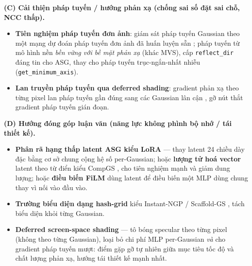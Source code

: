     \textbf{(C) Cải thiện pháp tuyến / hướng phản xạ (chống sai số đặt sai chỗ, NCC thấp).}
    \begin{itemize}
        \item \textbf{Tiên nghiệm pháp tuyến đơn ảnh}: giám sát pháp tuyến Gaussian
        theo một mạng dự đoán pháp tuyến đơn ảnh đã huấn luyện sẵn \cite{dnsplatter};
        pháp tuyến từ mô hình nền \textit{bền vững với bề mặt phản xạ} (khác MVS), cấp
        \texttt{reflect\_dir} đáng tin cho ASG, thay cho pháp tuyến trục-ngắn-nhất
        nhiễu (\texttt{get\_minimum\_axis}).
        \item \textbf{Lan truyền pháp tuyến qua deferred shading}: gradient phản xạ
        theo từng pixel lan pháp tuyến gần đúng sang các Gaussian lân cận
        \cite{deferredrefl}, gỡ nút thắt gradient pháp tuyến gián đoạn.
    \end{itemize}

    \textbf{(D) Hướng đóng góp luận văn (năng lực không phình bộ nhớ / tái thiết kế).}
    \begin{itemize}
        \item \textbf{Phân rã hạng thấp latent ASG kiểu LoRA} \cite{lora} --- thay
        latent 24 chiều dày đặc bằng cơ sở chung cộng hệ số per-Gaussian; hoặc
        \textbf{lượng tử hoá vector} latent theo từ điển kiểu CompGS \cite{compgs}, cho
        tiên nghiệm mạnh và giảm dung lượng; hoặc \textbf{điều biến FiLM}
        \cite{film} dùng latent để điều biến một MLP dùng chung thay vì nối vào đầu vào.
        \item \textbf{Trường biểu diện dạng hash-grid} kiểu Instant-NGP
        \cite{instantngp} / Scaffold-GS \cite{scaffoldgs}, tách biểu diện khỏi từng
        Gaussian.
        \item \textbf{Deferred screen-space shading} \cite{deferredrefl} --- tô bóng
        specular theo từng pixel (không theo từng Gaussian), loại bỏ chi phí MLP
        per-Gaussian \textit{và} cho gradient pháp tuyến mượt: điểm gặp gỡ tự nhiên
        giữa mục tiêu tốc độ và chất lượng phản xạ, hướng tái thiết kế mạnh nhất.
    \end{itemize}

